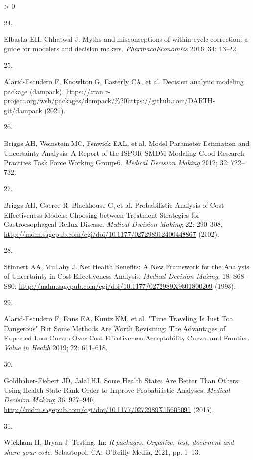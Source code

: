 \documentclass[
]{article}
\newlength{\cslhangindent}
\newlength{\csllabelwidth}
\newenvironment{CSLReferences}[2] %
 {%
  \setlength{\parindent}{0pt}
  \ifodd #1 \everypar{\setlength{\hangindent}{\cslhangindent}}\ignorespaces\fi
  \ifnum #2 > 0
  \setlength{\parskip}{#2\baselineskip}
  \fi
 }%
 {}
\newcommand{\CSLLeftMargin}[1]{\parbox[t]{\csllabelwidth}{#1}}
\newcommand{\CSLRightInline}[1]{\parbox[t]{\linewidth - \csllabelwidth}{#1}\break}
\begin{document}
\begin{CSLReferences}{0}{0}
\leavevmode\hypertarget{ref-Elbasha2016a}{}%
\CSLLeftMargin{24. }
\CSLRightInline{Elbasha EH, Chhatwal J. {Myths and misconceptions of within-cycle correction: a guide for modelers and decision makers}. \emph{PharmacoEconomics} 2016; 34: 13--22.}

\leavevmode\hypertarget{ref-Alarid-Escudero2021}{}%
\CSLLeftMargin{25. }
\CSLRightInline{Alarid-Escudero F, Knowlton G, Easterly CA, et al. Decision analytic modeling package (dampack), \url{https://cran.r-project.org/web/packages/dampack/\%20https://github.com/DARTH-git/dampack} (2021).}

\leavevmode\hypertarget{ref-Briggs2012}{}%
\CSLLeftMargin{26. }
\CSLRightInline{Briggs AH, Weinstein MC, Fenwick EAL, et al. {Model Parameter Estimation and Uncertainty Analysis: A Report of the ISPOR-SMDM Modeling Good Research Practices Task Force Working Group-6.} \emph{Medical Decision Making} 2012; 32: 722--732.}

\leavevmode\hypertarget{ref-Briggs2002}{}%
\CSLLeftMargin{27. }
\CSLRightInline{Briggs AH, Goeree R, Blackhouse G, et al. {Probabilistic Analysis of Cost-Effectiveness Models: Choosing between Treatment Strategies for Gastroesophageal Reflux Disease}. \emph{Medical Decision Making}; 22: 290--308, \url{http://mdm.sagepub.com/cgi/doi/10.1177/027298902400448867} (2002).}

\leavevmode\hypertarget{ref-Stinnett1998b}{}%
\CSLLeftMargin{28. }
\CSLRightInline{Stinnett AA, Mullahy J. {Net Health Benefits: A New Framework for the Analysis of Uncertainty in Cost-Effectiveness Analysis}. \emph{Medical Decision Making}; 18: S68--S80, \url{http://mdm.sagepub.com/cgi/doi/10.1177/0272989X9801800209} (1998).}

\leavevmode\hypertarget{ref-Alarid-Escudero2019}{}%
\CSLLeftMargin{29. }
\CSLRightInline{Alarid-Escudero F, Enns EA, Kuntz KM, et al. {"Time Traveling Is Just Too Dangerous" But Some Methods Are Worth Revisiting: The Advantages of Expected Loss Curves Over Cost-Effectiveness Acceptability Curves and Frontier}. \emph{Value in Health} 2019; 22: 611--618.}

\leavevmode\hypertarget{ref-Goldhaber-Fiebert2015}{}%
\CSLLeftMargin{30. }
\CSLRightInline{Goldhaber-Fiebert JD, Jalal HJ. {Some Health States Are Better Than Others: Using Health State Rank Order to Improve Probabilistic Analyses}. \emph{Medical Decision Making}; 36: 927--940, \url{http://mdm.sagepub.com/cgi/doi/10.1177/0272989X15605091} (2015).}

\leavevmode\hypertarget{ref-Wickham2021}{}%
\CSLLeftMargin{31. }
\CSLRightInline{Wickham H, Bryan J. {Testing}. In: \emph{R packages. Organize, test, document and share your code}. Sebastopol, CA: O'Reilly Media, 2021, pp. 1--13.}


\end{CSLReferences}
\end{document}
